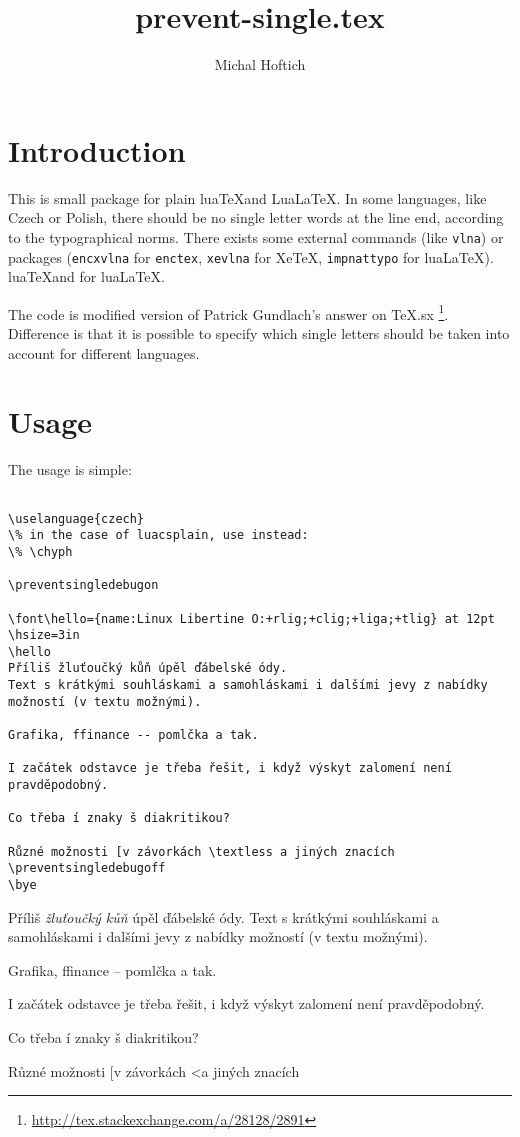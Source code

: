 \documentclass{ltxdoc}
\begin{document}
\title{prevent-single.tex}
\author{Michal Hoftich}
\maketitle
\section{Introduction}


This is small package for plain lua\TeX and Lua\LaTeX. In some languages, like
Czech or Polish, there should be no single letter words at the line
end, according to the typographical norms. There exists some
external commands (like \verb!vlna!) or packages (\verb!encxvlna!
for \verb!enctex!, \verb!xevlna! for Xe\TeX,
\verb!impnattypo! for lua\LaTeX). %
lua\TeX and for lua\LaTeX.

The code is modified version of Patrick Gundlach's answer on
TeX.sx%
\footnote{\url{http://tex.stackexchange.com/a/28128/2891}}.
Difference is that it is possible to specify which single letters
should be taken into account for different languages. 

\section{Usage}

The usage is simple:

\begin{verbatim}

\uselanguage{czech}
\% in the case of luacsplain, use instead:
\% \chyph

\preventsingledebugon

\font\hello={name:Linux Libertine O:+rlig;+clig;+liga;+tlig} at 12pt 
\hsize=3in
\hello
Příliš žluťoučký kůň úpěl ďábelské ódy. 
Text s krátkými souhláskami a samohláskami i dalšími jevy z nabídky možností (v textu možnými). 

Grafika, ffinance -- pomlčka a tak.

I začátek odstavce je třeba řešit, i když výskyt zalomení není pravděpodobný.

Co třeba í znaky š diakritikou?

Různé možnosti [v závorkách \textless a jiných znacích
\preventsingledebugoff
\bye
\end{verbatim}


\begin{minipage}{3in}
\preventsingledebugon
{}
Příliš \textit{žluťoučký kůň} úpěl ďábelské ódy. 
Text s krátkými souhláskami a samohláskami i dalšími jevy z nabídky možností (v textu možnými). 

Grafika, ffinance -- pomlčka a tak.

I začátek odstavce je třeba řešit, i když výskyt zalomení není pravděpodobný.

Co třeba í znaky š diakritikou?

Různé možnosti [v závorkách \textless a jiných znacích

\preventsingledebugoff
\preventsingledebugoff
\end{minipage}
\end{document}
